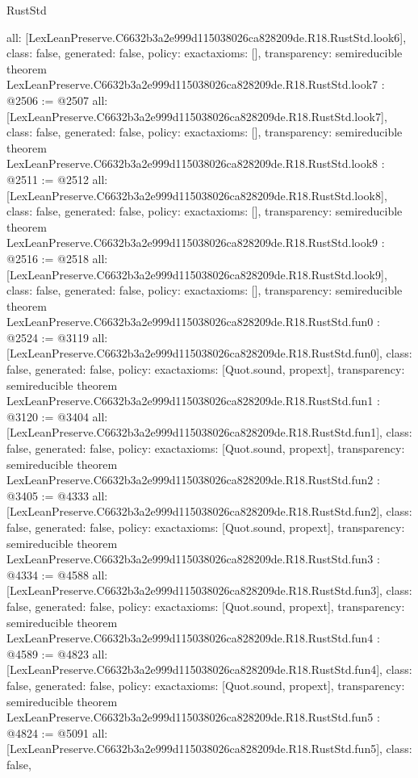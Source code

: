 \begin{lexlean}{RustStd}
\begin{coremodule}
{  all: [LexLeanPreserve.C6632b3a2e999d115038026ca828209de.R18.RustStd.look6],
  class: false,
  generated: false,
  policy: exact{axioms: []},
  transparency: semireducible
}
theorem LexLeanPreserve.C6632b3a2e999d115038026ca828209de.R18.RustStd.look7 : @2506 := @2507 {
  all: [LexLeanPreserve.C6632b3a2e999d115038026ca828209de.R18.RustStd.look7],
  class: false,
  generated: false,
  policy: exact{axioms: []},
  transparency: semireducible
}
theorem LexLeanPreserve.C6632b3a2e999d115038026ca828209de.R18.RustStd.look8 : @2511 := @2512 {
  all: [LexLeanPreserve.C6632b3a2e999d115038026ca828209de.R18.RustStd.look8],
  class: false,
  generated: false,
  policy: exact{axioms: []},
  transparency: semireducible
}
theorem LexLeanPreserve.C6632b3a2e999d115038026ca828209de.R18.RustStd.look9 : @2516 := @2518 {
  all: [LexLeanPreserve.C6632b3a2e999d115038026ca828209de.R18.RustStd.look9],
  class: false,
  generated: false,
  policy: exact{axioms: []},
  transparency: semireducible
}
theorem LexLeanPreserve.C6632b3a2e999d115038026ca828209de.R18.RustStd.fun0 : @2524 := @3119 {
  all: [LexLeanPreserve.C6632b3a2e999d115038026ca828209de.R18.RustStd.fun0],
  class: false,
  generated: false,
  policy: exact{axioms: [Quot.sound, propext]},
  transparency: semireducible
}
theorem LexLeanPreserve.C6632b3a2e999d115038026ca828209de.R18.RustStd.fun1 : @3120 := @3404 {
  all: [LexLeanPreserve.C6632b3a2e999d115038026ca828209de.R18.RustStd.fun1],
  class: false,
  generated: false,
  policy: exact{axioms: [Quot.sound, propext]},
  transparency: semireducible
}
theorem LexLeanPreserve.C6632b3a2e999d115038026ca828209de.R18.RustStd.fun2 : @3405 := @4333 {
  all: [LexLeanPreserve.C6632b3a2e999d115038026ca828209de.R18.RustStd.fun2],
  class: false,
  generated: false,
  policy: exact{axioms: [Quot.sound, propext]},
  transparency: semireducible
}
theorem LexLeanPreserve.C6632b3a2e999d115038026ca828209de.R18.RustStd.fun3 : @4334 := @4588 {
  all: [LexLeanPreserve.C6632b3a2e999d115038026ca828209de.R18.RustStd.fun3],
  class: false,
  generated: false,
  policy: exact{axioms: [Quot.sound, propext]},
  transparency: semireducible
}
theorem LexLeanPreserve.C6632b3a2e999d115038026ca828209de.R18.RustStd.fun4 : @4589 := @4823 {
  all: [LexLeanPreserve.C6632b3a2e999d115038026ca828209de.R18.RustStd.fun4],
  class: false,
  generated: false,
  policy: exact{axioms: [Quot.sound, propext]},
  transparency: semireducible
}
theorem LexLeanPreserve.C6632b3a2e999d115038026ca828209de.R18.RustStd.fun5 : @4824 := @5091 {
  all: [LexLeanPreserve.C6632b3a2e999d115038026ca828209de.R18.RustStd.fun5],
  class: false,
}
\end{coremodule}
\end{lexlean}
